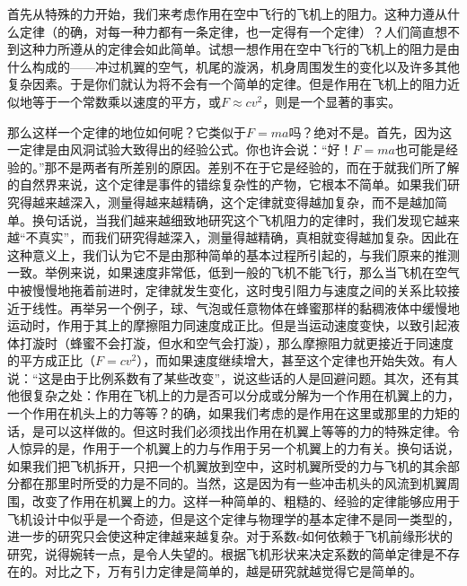 首先从特殊的力开始，我们来考虑作用在空中飞行的飞机上的阻力。这种力遵从什么定律（的确，对每一种力都有一条定律，也一定得有一个定律）？人们简直想不到这种力所遵从的定律会如此简单。试想一想作用在空中飞行的飞机上的阻力是由什么构成的——冲过机翼的空气，机尾的漩涡，机身周围发生的变化以及许多其他复杂因素。于是你们就认为将不会有一个简单的定律。但是作用在飞机上的阻力近似地等于一个常数乘以速度的平方，或$F\approx cv^2$，则是一个显著的事实。

那么这样一个定律的地位如何呢？它类似于$F=ma$吗？绝对不是。首先，因为这一定律是由风洞试验大致得出的经验公式。你也许会说：“好！$F=ma$也可能是经验的。”那不是两者有所差别的原因。差别不在于它是经验的，而在于就我们所了解的自然界来说，这个定律是事件的错综复杂性的产物，它根本不简单。如果我们研究得越来越深入，测量得越来越精确，这个定律就变得越加复杂，而不是越加简单。换句话说，当我们越来越细致地研究这个飞机阻力的定律时，我们发现它越来越“不真实”，而我们研究得越深入，测量得越精确，真相就变得越加复杂。因此在这种意义上，我们认为它不是由那种简单的基本过程所引起的，与我们原来的推测一致。举例来说，如果速度非常低，低到一般的飞机不能飞行，那么当飞机在空气中被慢慢地拖着前进时，定律就发生变化，这时曳引阻力与速度之间的关系比较接近于线性。再举另一个例子，球、气泡或任意物体在蜂蜜那样的黏稠液体中缓慢地运动时，作用于其上的摩擦阻力同速度成正比。但是当运动速度变快，以致引起液体打漩时（蜂蜜不会打漩，但水和空气会打漩），那么摩擦阻力就更接近于同速度的平方成正比（$F=cv^2$），而如果速度继续增大，甚至这个定律也开始失效。有人说：“这是由于比例系数有了某些改变”，说这些话的人是回避问题。其次，还有其他很复杂之处：作用在飞机上的力是否可以分成或分解为一个作用在机翼上的力，一个作用在机头上的力等等？的确，如果我们考虑的是作用在这里或那里的力矩的话，是可以这样做的。但这时我们必须找出作用在机翼上等等的力的特殊定律。令人惊异的是，作用于一个机翼上的力与作用于另一个机翼上的力有关。换句话说，如果我们把飞机拆开，只把一个机翼放到空中，这时机翼所受的力与飞机的其余部分都在那里时所受的力是不同的。当然，这是因为有一些冲击机头的风流到机翼周围，改变了作用在机翼上的力。这样一种简单的、粗糙的、经验的定律能够应用于飞机设计中似乎是一个奇迹，但是这个定律与物理学的基本定律不是同一类型的，进一步的研究只会使这种定律越来越复杂。对于系数$c$如何依赖于飞机前缘形状的研究，说得婉转一点，是令人失望的。根据飞机形状来决定系数的简单定律是不存在的。对比之下，万有引力定律是简单的，越是研究就越觉得它是简单的。

